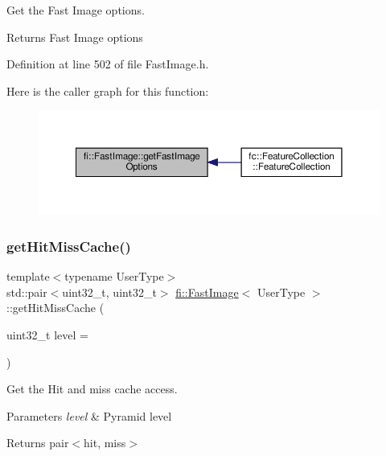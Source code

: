 Get the Fast Image options. 

\begin{DoxyReturn}{Returns}
Fast Image options 
\end{DoxyReturn}


Definition at line 502 of file Fast\+Image.\+h.

Here is the caller graph for this function\+:
\nopagebreak
\begin{figure}[H]
\begin{center}
\leavevmode
\includegraphics[width=350pt]{dc/d6b/classfi_1_1FastImage_ada03468c50745d94854fcbe87227bbfd_icgraph}
\end{center}
\end{figure}
\mbox{\label{classfi_1_1FastImage_a96ce689446ebd9ee200f8a8f44eb28c0}} 
\subsubsection{\texorpdfstring{get\+Hit\+Miss\+Cache()}{getHitMissCache()}}
{\footnotesize\ttfamily template$<$typename User\+Type$>$ \\
std\+::pair$<$uint32\+\_\+t, uint32\+\_\+t$>$ \hyperlink{classfi_1_1FastImage}{fi\+::\+Fast\+Image}$<$ User\+Type $>$\+::get\+Hit\+Miss\+Cache (\begin{DoxyParamCaption}\item[{uint32\+\_\+t}]{level = {} }\end{DoxyParamCaption})\hspace{0.3cm}{\ttfamily [inline]}}



Get the Hit and miss cache access. 


\begin{DoxyParams}{Parameters}
{\em level} & Pyramid level \\
\hline
\end{DoxyParams}
\begin{DoxyReturn}{Returns}
pair$<$hit, miss$>$ 
\end{DoxyReturn}


